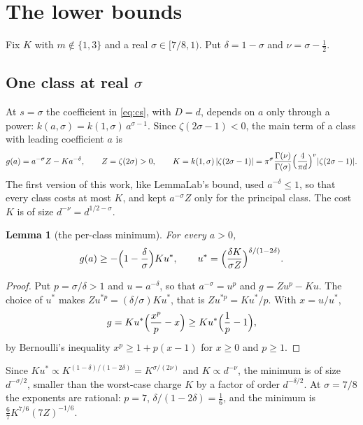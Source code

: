 \documentclass[11pt]{article}
\newtheorem{lemma}[theorem]{Lemma}
\theoremstyle{definition}
\begin{document}
\section{The lower bounds}\label{sec:lower}

Fix $K$ with $m \notin \{1, 3\}$ and a real $\sigma \in [7/8, 1)$. Put $\delta = 1 - \sigma$ and $\nu = \sigma - \frac12$.

\subsection{One class at real \texorpdfstring{$\sigma$}{sigma}}

At $s = \sigma$ the coefficient in \eqref{eq:cs}, with $D = d$, depends on $a$ only through a power: $k(a,\sigma) = k(1,\sigma)\,a^{\sigma - 1}$. Since $\zeta(2\sigma - 1) < 0$, the main term of a class with leading coefficient $a$ is
\[
g(a) = a^{-\sigma}Z - K a^{-\delta}, \qquad Z = \zeta(2\sigma) > 0, \qquad K = k(1,\sigma)\,|\zeta(2\sigma - 1)| = \pi^\sigma\frac{\Gamma(\nu)}{\Gamma(\sigma)}\Bigl(\frac{4}{\pi d}\Bigr)^{\nu}|\zeta(2\sigma - 1)|.
\]
The first version of this work, like LemmaLab's bound, used $a^{-\delta} \le 1$, so that every class costs at most $K$, and kept $a^{-\sigma}Z$ only for the principal class. The cost $K$ is of size $d^{-\nu} = d^{1/2-\sigma}$.

\begin{lemma}[the per-class minimum]\label{lem:floor}
For every $a > 0$,
\[
g(a) \ge -\Bigl(1 - \frac\delta\sigma\Bigr)K u^*, \qquad u^* = \Bigl(\frac{\delta K}{\sigma Z}\Bigr)^{\delta/(1-2\delta)} .
\]
\end{lemma}

\begin{proof}
Put $p = \sigma/\delta > 1$ and $u = a^{-\delta}$, so that $a^{-\sigma} = u^p$ and $g = Zu^p - Ku$. The choice of $u^*$ makes $Z u^{*p} = (\delta/\sigma)Ku^*$, that is $Zu^{*p} = Ku^*/p$. With $x = u/u^*$,
\[
g = Ku^*\Bigl(\frac{x^p}{p} - x\Bigr) \ge Ku^*\Bigl(\frac1p - 1\Bigr),
\]
by Bernoulli's inequality $x^p \ge 1 + p(x - 1)$ for $x \ge 0$ and $p \ge 1$.
\end{proof}

Since $Ku^* \propto K^{(1-\delta)/(1-2\delta)} = K^{\sigma/(2\nu)}$ and $K \propto d^{-\nu}$, the minimum is of size $d^{-\sigma/2}$, smaller than the worst-case charge $K$ by a factor of order $d^{-\delta/2}$. At $\sigma = 7/8$ the exponents are rational: $p = 7$, $\delta/(1-2\delta) = \frac16$, and the minimum is $\frac67 K^{7/6}(7Z)^{-1/6}$.
\end{document}
